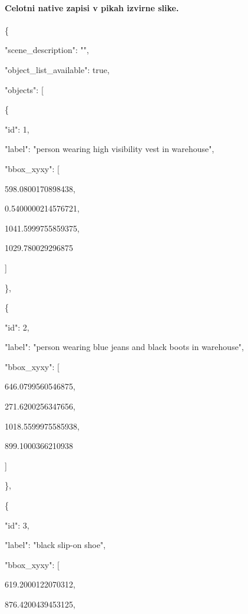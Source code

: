 \documentclass[10pt,a4paper]{article}
\begin{document}
\paragraph{Celotni native zapisi v pikah izvirne slike.}
\{\par
  "scene\_description":\allowbreak{} "",\allowbreak{}\par
  "object\_list\_available":\allowbreak{} true,\allowbreak{}\par
  "objects":\allowbreak{} [\par
    \{\par
      "id":\allowbreak{} 1,\allowbreak{}\par
      "label":\allowbreak{} "person wearing high visibility vest in warehouse",\allowbreak{}\par
      "bbox\_xyxy":\allowbreak{} [\par
        598.0800170898438,\allowbreak{}\par
        0.5400000214576721,\allowbreak{}\par
        1041.5999755859375,\allowbreak{}\par
        1029.780029296875\par
      ]\par
    \},\allowbreak{}\par
    \{\par
      "id":\allowbreak{} 2,\allowbreak{}\par
      "label":\allowbreak{} "person wearing blue jeans and black boots in warehouse",\allowbreak{}\par
      "bbox\_xyxy":\allowbreak{} [\par
        646.0799560546875,\allowbreak{}\par
        271.6200256347656,\allowbreak{}\par
        1018.5599975585938,\allowbreak{}\par
        899.1000366210938\par
      ]\par
    \},\allowbreak{}\par
    \{\par
      "id":\allowbreak{} 3,\allowbreak{}\par
      "label":\allowbreak{} "black slip-on shoe",\allowbreak{}\par
      "bbox\_xyxy":\allowbreak{} [\par
        619.2000122070312,\allowbreak{}\par
        876.4200439453125,\allowbreak{}\par
\end{document}
